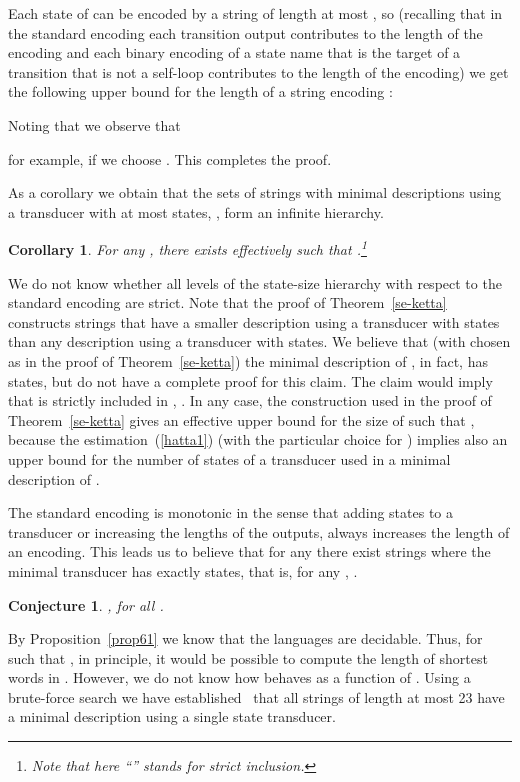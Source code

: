 \documentclass[copyright]{eptcs}
\def \prend{\vrule depth-1pt height7pt width6pt}
\def \endpf{{\ \ \prend \medbreak}}
\newtheorem{corollary}{Corollary}[section]
\newtheorem{conjecture}[theorem]{Conjecture}
\begin{document}
Each state of  can be encoded by a string
of length at most ,  so 
(recalling that in the standard encoding
each transition output  contributes  to
the length of the encoding and
each binary encoding  of a state name that is the
target of a transition that is not a self-loop contributes
 to the length of the encoding) we
get the following upper bound 
for the length of
a string  encoding :

Noting that  we observe that

for example, if we choose .
This completes the proof.
\endpf

As a corollary we obtain that the sets of strings
with minimal descriptions using
a transducer   with  at most  states, , form an infinite
hierarchy. 

\begin{corollary}
\label{se-ketta2}
For any , there exists effectively  such that
.\footnote{Note that here
``'' stands for
strict inclusion.}
\end{corollary}

We do not know whether all levels of the state-size hierarchy
with respect to the standard encoding are strict.
Note that the proof of Theorem~\ref{se-ketta} constructs
strings  
that have a smaller description
using a transducer with  states than any description
using a transducer with  states. 
We believe that (with  chosen as in the proof of Theorem~\ref{se-ketta})
the minimal description of , in fact, has  states,
but do not have a complete proof for this claim.
The claim would imply
that  is strictly included in , .
In any case, the construction used in the proof of
Theorem~\ref{se-ketta} gives an effective upper bound for the
size of  such that ,
because the estimation~(\ref{hatta1}) (with the particular
choice for ) implies also an
upper bound for the number of states
of a transducer used in a minimal description of .

The standard encoding is monotonic in the sense that  adding
states to a transducer or increasing the lengths of the outputs,
always increases the length of an encoding. This leads us to believe
that for any  there exist strings where the minimal transducer has
exactly  states, that is, 
for any , .

\begin{conjecture}
\label{se-ketta3}
, for all .
\end{conjecture}

By Proposition~\ref{prop61} we know that the languages
 are decidable. 
Thus, for  such  that , 
in principle, it would be possible to compute
the  length  of shortest words in .
However, we do not know how
 behaves as a function of . Using a brute-force
search we have established~\cite{CSR} that all strings of length at most
23 have a minimal description  using a single
state transducer.
\end{document}

